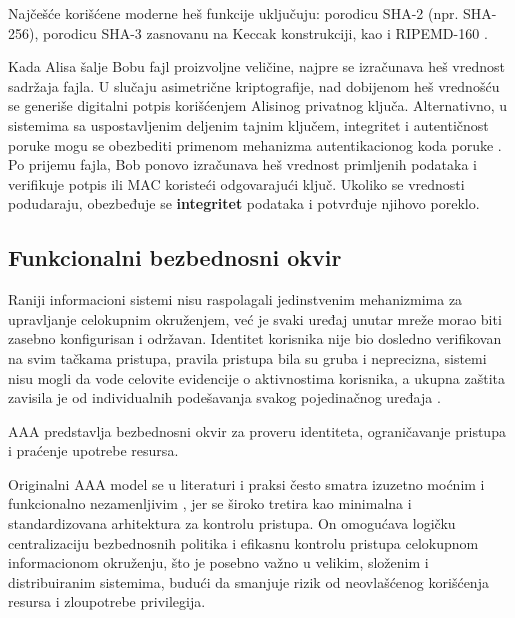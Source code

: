 Najčešće korišćene moderne heš funkcije uključuju: porodicu SHA-2 \cite{pub2012secure} (npr. SHA-256), porodicu SHA-3 \cite{dworkin2015sha} zasnovanu na Keccak konstrukciji, kao i RIPEMD-160 \cite{dobbertin1996ripemd}.

Kada Alisa šalje Bobu fajl proizvoljne veličine, najpre se izračunava heš vrednost sadržaja fajla. U slučaju asimetrične kriptografije, nad dobijenom heš vrednošću se generiše digitalni potpis korišćenjem Alisinog privatnog ključa. Alternativno, u sistemima sa uspostavljenim deljenim tajnim ključem, integritet i autentičnost poruke mogu se obezbediti primenom mehanizma autentikacionog koda poruke \cite{krawczyk1997hmac} . Po prijemu fajla, Bob ponovo izračunava heš vrednost primljenih podataka i verifikuje potpis ili MAC koristeći odgovarajući ključ. Ukoliko se vrednosti podudaraju, obezbeđuje se \textbf{integritet} podataka i potvrđuje njihovo poreklo.

\subsection{Funkcionalni bezbednosni okvir}
Raniji informacioni sistemi nisu raspolagali jedinstvenim mehanizmima za upravljanje celokupnim okruženjem, već je svaki uređaj unutar mreže morao biti zasebno konfigurisan i održavan. Identitet korisnika nije bio dosledno verifikovan na svim tačkama pristupa, pravila pristupa bila su gruba i neprecizna, sistemi nisu mogli da vode celovite evidencije o aktivnostima korisnika, a ukupna zaštita zavisila je od individualnih podešavanja svakog pojedinačnog uređaja \cite{cameron2005laws}.

\begin{definicija}
AAA \cite{metz2002aaa}  predstavlja bezbednosni okvir za proveru identiteta, ograničavanje pristupa i praćenje upotrebe resursa.
\end{definicija}

Originalni AAA model se u literaturi i praksi često smatra izuzetno moćnim i funkcionalno nezamenljivim \cite{de2000generic}, jer se široko tretira kao minimalna i standardizovana arhitektura za kontrolu pristupa. On omogućava logičku centralizaciju bezbednosnih politika i efikasnu kontrolu pristupa celokupnom informacionom okruženju, što je posebno važno u velikim, složenim i distribuiranim sistemima, budući da smanjuje rizik od neovlašćenog korišćenja resursa i zloupotrebe privilegija.


